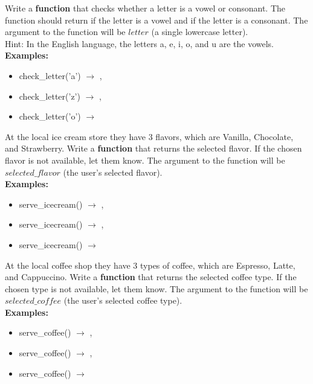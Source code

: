 	\item 
		Write a \textbf{function} that checks whether a letter is a vowel or consonant.  The function should return  if the letter is a vowel and
		 if the letter is a consonant. The argument to the function will be $letter$ (a single lowercase letter).\\
		Hint: In the English language, the letters a, e, i, o, and u are the vowels.\\
		\textbf{Examples:}		
		\begin{itemize}
			\item  check\_letter('a') $\rightarrow$ , 
			\item  check\_letter('z') $\rightarrow$ , 
			\item  check\_letter('o') $\rightarrow$  
		\end{itemize}



	\item 
		At the local ice cream store they have 3 flavors, which are Vanilla, Chocolate, and Strawberry.  
		Write a \textbf{function} that returns the selected flavor. If the chosen flavor is not available, let them know.
		The argument to the function will be $selected\_flavor$ (the user's selected flavor).\\
		\textbf{Examples:}		
		\begin{itemize}
			\item  serve\_icecream() $\rightarrow$ , 
			\item  serve\_icecream() $\rightarrow$ , 
			\item  serve\_icecream() $\rightarrow$  
		\end{itemize}


	\item 
		At the local coffee shop they have 3 types of coffee, which are Espresso, Latte, and Cappuccino.  
		Write a \textbf{function} that returns the selected coffee type. If the chosen type is not available, let them know.
		The argument to the function will be $selected\_coffee$ (the user's selected coffee type).\\
		\textbf{Examples:}		
		\begin{itemize}
			\item  serve\_coffee() $\rightarrow$ , 
			\item  serve\_coffee() $\rightarrow$ , 
			\item  serve\_coffee() $\rightarrow$ 
		\end{itemize}



